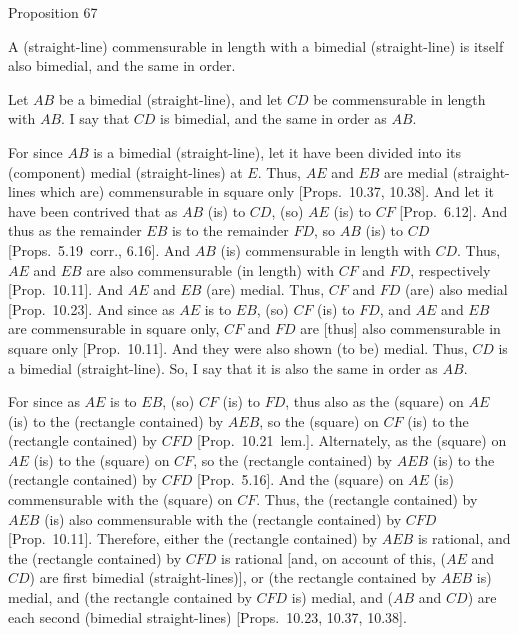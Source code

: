 
\begin{center}
{\large Proposition 67}
\end{center}

A (straight-line) commensurable
in length with a bimedial (straight-line) is  itself also bimedial, and
 the same in order.

\epsfysize=0.7in 
\centerline{}
 
Let $AB$ be a bimedial (straight-line), and let $CD$ be commensurable
in length with $AB$. I say that $CD$ is bimedial, and the same in order as
$AB$.

For since $AB$ is a bimedial (straight-line), let it have been divided into its
(component) medial (straight-lines) at $E$. Thus, $AE$ and $EB$
are medial (straight-lines which are) commensurable in square only [Props.~10.37, 10.38]. And
let it have been contrived that as $AB$ (is) to $CD$, (so) $AE$ (is)
to $CF$ [Prop.~6.12]. And thus as the remainder $EB$ is to the remainder $FD$, so $AB$ (is) to $CD$ [Props.~5.19~corr., 6.16].
And $AB$ (is) commensurable in length with $CD$. Thus, $AE$
and $EB$ are also commensurable (in length) with $CF$ and $FD$, respectively [Prop.~10.11]. And 
$AE$ and $EB$ (are) medial. Thus, $CF$ and $FD$ (are) also
medial [Prop.~10.23]. And since as $AE$
is to $EB$, (so) $CF$ (is) to $FD$, and $AE$ and $EB$ are commensurable
in square only, $CF$ and $FD$ are [thus] also commensurable in square only
[Prop.~10.11]. And they were also shown (to be)
medial. Thus, $CD$ is a bimedial (straight-line). So, I say that it is also the same in order as $AB$.

For since as $AE$ is to $EB$, (so) $CF$ (is) to $FD$, thus also as the
(square) on $AE$ (is) to the (rectangle contained) by $AEB$, so the (square)
on $CF$ (is) to the (rectangle contained) by $CFD$ [Prop.~10.21~lem.]. Alternately, as the (square)
on $AE$ (is) to the (square) on $CF$, so the (rectangle
contained) by $AEB$ (is) to the (rectangle contained) by $CFD$ [Prop.~5.16]. And the (square) on $AE$
(is) commensurable with the (square) on $CF$. Thus, the (rectangle
contained) by $AEB$ (is) also commensurable with the (rectangle contained)
by $CFD$ [Prop.~10.11]. Therefore,  either the
(rectangle contained) by $AEB$ is rational, and  the (rectangle contained) by
$CFD$ is rational [and, on account of this, ($AE$ and $CD$) are first
bimedial (straight-lines)], or (the rectangle contained by $AEB$ is) medial,
and (the rectangle contained by $CFD$ is) medial, and ($AB$ and
$CD$) are each second (bimedial straight-lines) [Props.~10.23, 10.37, 10.38].

